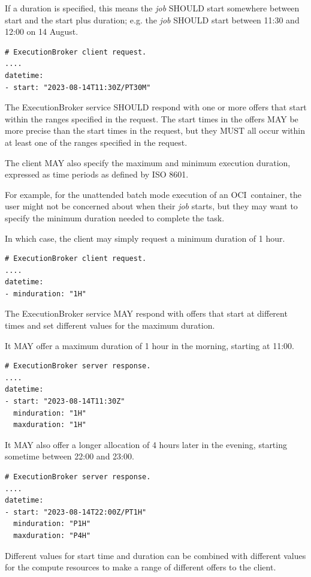 \documentclass[11pt,a4paper]{ivoa}
\newcommand{\execbrokerclass} {ExecutionBroker}
\newcommand{\ocicontainer} {OCI~container}
\newcommand{\job} {\textit{job}}
\begin{document}
If a duration is specified, this means the \job{} SHOULD start somewhere between
start and the start plus duration;
e.g. the \job{} SHOULD start between 11:30 and 12:00 on 14 August.
\begin{lstlisting}[]
# ExecutionBroker client request.
....
datetime:
- start: "2023-08-14T11:30Z/PT30M"
\end{lstlisting}

The \execbrokerclass{} service SHOULD respond with one or more offers that start within
the ranges specified in the request.
The start times in the offers MAY be more precise than the start times in the request,
but they MUST all occur within at least one of the ranges specified in the request.

The client MAY also specify the maximum and minimum execution duration,
expressed as time periods as defined by ISO 8601.

For example, for the unattended batch mode execution of an \ocicontainer, the user might not be concerned about
when their \job{} starts, but they may want to specify the minimum duration needed to complete the task.

In which case, the client may simply request a minimum duration of 1 hour.
\begin{lstlisting}[]
# ExecutionBroker client request.
....
datetime:
- minduration: "1H"
\end{lstlisting}

The \execbrokerclass{} service MAY respond with offers that start at different times and
set different values for the maximum duration.

It MAY offer a maximum duration of 1 hour in the morning, starting at 11:00.
\begin{lstlisting}[]
# ExecutionBroker server response.
....
datetime:
- start: "2023-08-14T11:30Z"
  minduration: "1H"
  maxduration: "1H"
\end{lstlisting}

It MAY also offer a longer allocation of 4 hours later in the evening,
starting sometime between 22:00 and 23:00.
\begin{lstlisting}[]
# ExecutionBroker server response.
....
datetime:
- start: "2023-08-14T22:00Z/PT1H"
  minduration: "P1H"
  maxduration: "P4H"
\end{lstlisting}

Different values for start time and duration can be combined with different values for the
compute resources to make a range of different offers to the client.
\end{document}
